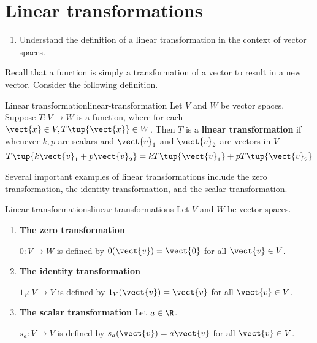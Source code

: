 \section{Linear transformations}

\begin{outcome}
  \begin{enumerate}
  \item Understand the definition of a linear transformation in the
    context of vector spaces.
  \end{enumerate}
\end{outcome}

Recall that a function is simply a transformation of a vector to result in a new vector. Consider the following definition. 

\begin{definition}{Linear transformation}{linear-transformation}
 Let $V$ and $W$ be vector spaces. Suppose $T: V \to W$ is a function, where for each
$\vect{x} \in V ,T\tup{\vect{x}}\in W$. Then $T$ is a
\textbf{linear transformation} if whenever $k ,p $ are scalars and 
$\vect{v}_1$ and $\vect{v}_2$ are vectors in $V$
\begin{equation*}
T\tup{k \vect{v}_1 + p \vect{v}_2 } = kT\tup{\vect{v}_1}+ pT\tup{\vect{v}_{2} }
\end{equation*}
\end{definition}

Several important examples of linear transformations include the zero transformation, the identity transformation, and the scalar transformation. 

\begin{example}{Linear transformations}{linear-transformations}
Let $V$ and $W$ be vector spaces.

\begin{enumerate}
\item \textbf{The zero transformation}

$0:V\to W$ is defined by $0(\vect{v})=\vect{0}$ for all $\vect{v}\in V$.


\item \textbf{The identity transformation}

$1_V:V\to V$ is defined by $1_V(\vect{v})=\vect{v}$ for all $\vect{v}\in V$.

\item \textbf{The scalar transformation}
Let $a\in\R$.

$s_a:V\to V$ is defined by $s_a(\vect{v})=a\vect{v}$ for all $\vect{v}\in V$.
\end{enumerate}
\end{example}

